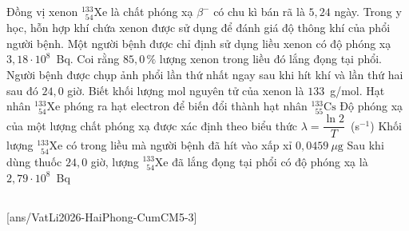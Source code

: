 	\begin{ex}%
		Đồng vị xenon ${}^{133}_{\phantom{1}54}\text{Xe}$ là chất phóng xạ $\beta^-$ có chu kì bán rã là $5{,}24$ ngày. Trong y học, hỗn hợp khí chứa xenon được sử dụng để đánh giá độ thông khí của phổi người bệnh. Một người bệnh được chỉ định sử dụng liều xenon có độ phóng xạ $3{,}18\cdot 10^8$~Bq. Coi rằng $85{,}0\,\%$ lượng xenon trong liều đó lắng đọng tại phổi. Người bệnh được chụp ảnh phổi lần thứ nhất ngay sau khi hít khí và lần thứ hai sau đó $24{,}0$ giờ. Biết khối lượng mol nguyên tử của xenon là $133$~g/mol.
		\choiceTFt
		{\True Hạt nhân ${}^{133}_{\phantom{1}54}\text{Xe}$ phóng ra hạt electron để biến đổi thành hạt nhân ${}^{133}_{\phantom{1}55}\text{Cs}$}
		{Độ phóng xạ của một lượng chất phóng xạ được xác định theo biểu thức \mbox{$\lambda=\dfrac{\ln 2}{T}$ (s$^{-1}$)}}
		{\True Khối lượng ${}^{133}_{\phantom{1}54}\text{Xe}$ có trong liều mà người bệnh đã hít vào xấp xỉ $0{,}0459~\mu\text{g}$}
		{Sau khi dùng thuốc $24{,}0$ giờ, lượng ${}^{133}_{\phantom{1}54}\text{Xe}$ đã lắng đọng tại phổi có độ phóng xạ là $2{,}79\cdot 10^8$~Bq}
	\end{ex}

	\subsection*{}
	\setcounter{ex}{0}
	[ans/VatLi2026-HaiPhong-CumCM5-3]

